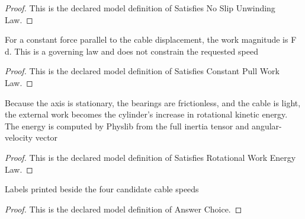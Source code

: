 \begin{proof}
  This is the declared model definition of Satisfies No Slip Unwinding Law.
\end{proof}
\begin{definition}
  \label{def:physics:phyx-mini-0820:phyxminiproblems-problemphyxmini0820-satisfiesconstantpullworklaw}
  For a constant force parallel to the cable displacement, the work magnitude is F d. This is a governing law and does not constrain the requested speed
\end{definition}
\begin{proof}
  This is the declared model definition of Satisfies Constant Pull Work Law.
\end{proof}
\begin{definition}
  \label{def:physics:phyx-mini-0820:phyxminiproblems-problemphyxmini0820-satisfiesrotationalworkenergylaw}
  Because the axis is stationary, the bearings are frictionless, and the cable is light, the external work becomes the cylinder's increase in rotational kinetic energy. The energy is computed by Physlib from the full inertia tensor and angular-velocity vector
\end{definition}
\begin{proof}
  This is the declared model definition of Satisfies Rotational Work Energy Law.
\end{proof}
\begin{definition}
  \label{def:physics:phyx-mini-0820:phyxminiproblems-problemphyxmini0820-answerchoice}
  Labels printed beside the four candidate cable speeds
\end{definition}
\begin{proof}
  This is the declared model definition of Answer Choice.
\end{proof}
